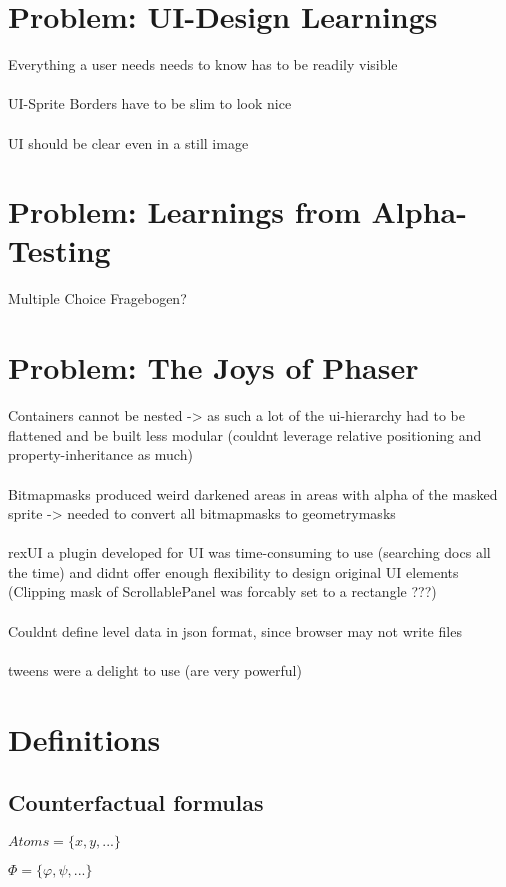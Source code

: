 \documentclass[a4paper,american]{paper}
\begin{document}
\section*{Problem: UI-Design Learnings}
Everything a user needs needs to know has to be readily visible  \\\\
UI-Sprite Borders have to be slim to look nice \\\\
UI should be clear even in a still image

\section*{Problem: Learnings from Alpha-Testing}
Multiple Choice Fragebogen?

\section*{Problem: The Joys of Phaser}
Containers cannot be nested -> as such a lot of the ui-hierarchy had to be flattened and be built less modular (couldnt leverage relative positioning and property-inheritance as much) \\\\
Bitmapmasks produced weird darkened areas in areas with alpha of the masked sprite -> needed to convert all bitmapmasks to geometrymasks \\\\
rexUI a plugin developed for UI was time-consuming to use (searching docs all the time) and didnt offer enough flexibility to design original UI elements (Clipping mask of ScrollablePanel was forcably set to a rectangle ???) \\\\
Couldnt define level data in json format, since browser may not write files \\\\
tweens were a delight to use (are very powerful)

\section*{Definitions}
\subsection{Counterfactual formulas}
$Atoms = \{x,y,...\}$

$\Phi = \{\varphi, \psi,... \}$
\end{document}
